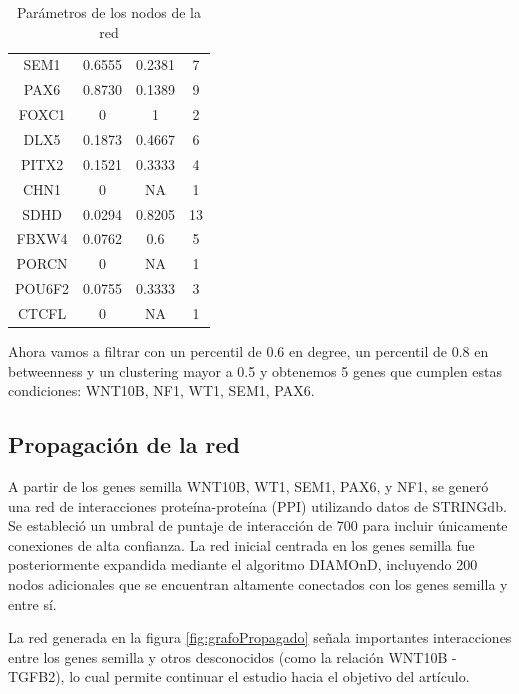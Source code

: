 \begin{table}[ht]
\begin{tabular}{|c|c|c|c|}
		SEM1 & 0.6555 & 0.2381 & 7 \\
		PAX6 & 0.8730 & 0.1389 & 9 \\
		FOXC1 & 0 & 1 & 2 \\
		DLX5 & 0.1873 & 0.4667 & 6 \\
		PITX2 & 0.1521 & 0.3333 & 4 \\
		CHN1 & 0 & NA & 1 \\
		SDHD & 0.0294 & 0.8205 & 13 \\
		FBXW4 & 0.0762 & 0.6 & 5 \\
		PORCN & 0 & NA & 1 \\
		POU6F2 & 0.0755 & 0.3333 & 3 \\
		CTCFL & 0 & NA & 1 \\ \hline
	\end{tabular}
	\caption{Parámetros de los nodos de la red}
	\label{tab:parametros_nodos_red}
\end{table}

Ahora vamos a filtrar con un percentil de 0.6 en degree, un percentil de 0.8 en betweenness y un clustering mayor a 0.5 y obtenemos 5 genes que cumplen estas condiciones: WNT10B, NF1, WT1, SEM1, PAX6.

\subsection{Propagación de la red}

A partir de los genes semilla WNT10B, WT1, SEM1, PAX6, y NF1, se generó una red de interacciones proteína-proteína (PPI) utilizando datos de STRINGdb. Se estableció un umbral de puntaje de interacción de 700 para incluir únicamente conexiones de alta confianza. La red inicial centrada en los genes semilla fue posteriormente expandida mediante el algoritmo DIAMOnD, incluyendo 200 nodos adicionales que se encuentran altamente conectados con los genes semilla y entre sí.

La red generada en la figura \ref{fig:grafoPropagado} señala importantes interacciones entre los genes semilla y otros desconocidos (como la relación WNT10B - TGFB2), lo cual permite continuar el estudio hacia el objetivo del artículo.

